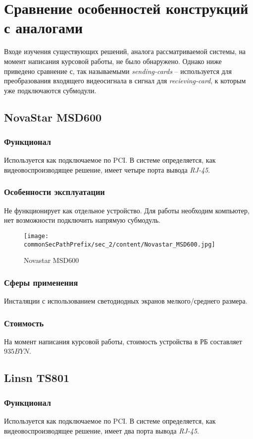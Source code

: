 \section{Сравнение особенностей конструкций с аналогами}
\label{sec:analogs}
Входе изучения существующих решений, аналога рассматриваемой системы, на момент написания курсовой работы, не было обнаружено. Однако ниже приведено сравнение с, так называемыми \textit{sending-cards} -- используется для преобразования входящего видеосигнала в сигнал для \textit{recieving-card}, к которым уже подключаются субмодули.

\subsection{NovaStar MSD600}
\subsubsection{Функционал}
Используется как подключаемое по PCI. В системе определяется, как видеовоспроизводящее решение, имеет четыре порта вывода \textit{RJ-45}. 
\subsubsection{Особенности эксплуатации}
Не функционирует как отдельное устройство. Для работы необходим компьютер, нет возможности подключить напрямую субмодуль.
\begin{figure}[ht]
    \centering
    \texttt{[image: \\commonSecPathPrefix/sec\_2/content/Novastar\_MSD600.jpg]}
    \caption{Novastar MSD600}
\end{figure}
\subsubsection{Сферы применения}
Инсталяции с использованием светодиодных экранов мелкого/среднего размера.
\subsubsection{Стоимость}
На момент написания курсовой работы, стоимость устройства в РБ составляет \(935BYN\).

\subsection{Linsn TS801}
\subsubsection{Функционал}
Используется как подключаемое по PCI. В системе определяется, как видеовоспроизводящее решение, имеет два порта вывода \textit{RJ-45}. 
